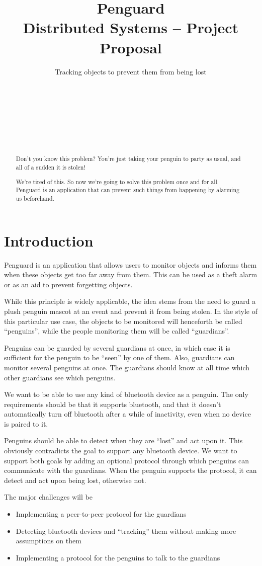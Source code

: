 \documentclass{report}
\title{Penguard\\
\normalsize{Distributed Systems -- Project Proposal}}
\subtitle{Tracking objects to prevent them from being lost}
\author{
\alignauthor {\normalsize Nils Leuzinger}\\
	\affaddr{{\normalsize 14-939-896}}\\
	\email{{\normalsize nilsl@student.ethz.ch}}
\alignauthor {\normalsize Nicole Thurnherr}\\
	\affaddr{{\normalsize 11-925-328}}\\
	\email{{\normalsize nicoleth@student.ethz.ch}}
\alignauthor {\normalsize Aline Abler}\\
	\affaddr{{\normalsize 14-920-979}}\\
	\email{{\normalsize ablera@student.ethz.ch}}
}
\begin{document}
\maketitle

\begin{abstract}
Don't you know this problem? You're just taking your penguin to party as usual, and all of a sudden it is stolen! 

We're tired of this. So now we're going to solve this problem once and for all. Penguard is an application that can prevent such things from happening by alarming us beforehand.
\end{abstract}

\section{Introduction}

Penguard is an application that allows users to monitor objects and informs them when these objects get too far away from them. This can be used as a theft alarm or as an aid to prevent forgetting objects.

While this principle is widely applicable, the idea stems from the need to guard a plush penguin mascot at an event and prevent it from being stolen. In the style of this particular use case, the objects to be monitored will henceforth be called ``penguins'', while the people monitoring them will be called ``guardians''.

Penguins can be guarded by several guardians at once, in which case it is sufficient for the penguin to be ``seen'' by one of them. Also, guardians can monitor several penguins at once. The guardians should know at all time which other guardians see which penguins.

We want to be able to use any kind of bluetooth device as a penguin. The only requirements should be that it supports bluetooth, and that it doesn't automatically turn off bluetooth after a while of inactivity, even when no device is paired to it.

Penguins should be able to detect when they are ``lost'' and act upon it. This obviously contradicts the goal to support any bluetooth device. We want to support both goals by adding an optional protocol through which penguins can communicate with the guardians. When the penguin supports the protocol, it can detect and act upon being lost, otherwise not.

The major challenges will be

\begin{itemize}
    \item Implementing a peer-to-peer protocol for the guardians
    \item Detecting bluetooth devices and ``tracking'' them without making more assumptions on them
    \item Implementing a protocol for the penguins to talk to the guardians
\end{itemize}
\end{document}
